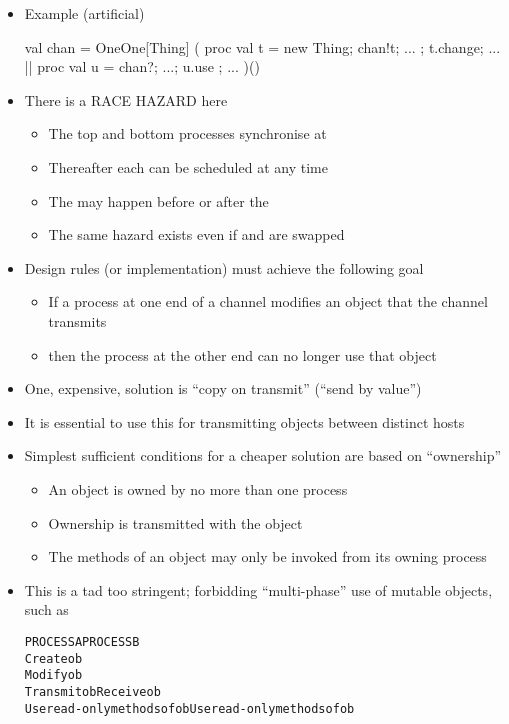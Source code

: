 \documentclass{concdistfoils}
\begin{document}
\begin{slide}
\begin{itemize}
\item Example (artificial)
\begin{scala}
  val chan = OneOne[Thing]  
  (   proc { val t = new Thing; chan!t; ... ; t.change; ... } 
   || proc { val u = chan?; ...; u.use ; ... }
  )()       
\end{scala}
\vfill
\item There is a RACE HAZARD here
\begin{itemize}
\item The top and bottom processes synchronise at 
\item Thereafter each can be scheduled at any time
\item The  may happen before or after the 
\item The same hazard exists even if  and  are swapped
\end{itemize}
\vfill
\item Design rules (or implementation) must achieve the following goal
\begin{itemize}
\item   If a process at one end of a channel modifies an object that the channel transmits
\item[] then the process at the other end can no longer use that object
\end{itemize}
\end{itemize}
\end{slide}

\begin{slide}
\begin{itemize}
\item One, expensive, solution is ``copy on transmit'' (``send by value'')
\item It is essential to use this for transmitting objects between distinct hosts
\vfill
\item Simplest sufficient conditions for a cheaper solution are based on ``ownership''
\begin{itemize}
\item An object is owned by no more than one process
\item Ownership is transmitted with the object
\item The methods of an object may only be invoked from its owning process
\end{itemize}
\vfill
\item This is a tad too stringent; forbidding ``multi-phase'' use of mutable objects, such as
\begin{alltt}
PROCESS A                               PROCESS B
Create ob
Modify ob
Transmit ob                             Receive ob
Use read-only methods of ob             Use read-only methods of ob
\end{alltt}
\end{itemize}
\end{slide}
\end{document}
